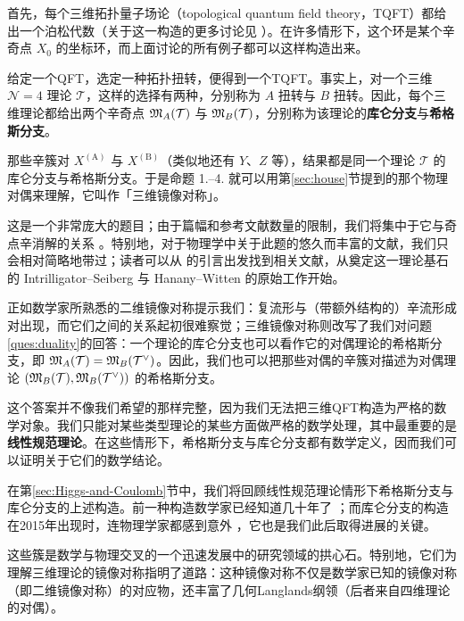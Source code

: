首先，每个三维拓扑量子场论（topological quantum field theory，TQFT）都给出一个泊松代数（关于这一构造的更多讨论见 \cite{BBBDN}）。在许多情形下，这个环是某个辛奇点 $X_0$ 的坐标环，而上面讨论的所有例子都可以这样构造出来。

给定一个QFT，选定一种拓扑扭转，便得到一个TQFT。事实上，对一个三维 $\mathcal{N}=4$ 理论 $\mathcal{T}$，这样的选择有两种，分别称为 $A$ 扭转与 $B$ 扭转。因此，每个三维理论都给出两个辛奇点 $\mathfrak{M}_A(\mathcal{T})$ 与 $\mathfrak{M}_B(\mathcal{T})$，分别称为该理论的\textbf{库仑分支}与\textbf{希格斯分支}。

那些辛簇对 $X^{(\mathrm{A})}$ 与 $X^{(\mathrm{B})}$（类似地还有 $Y$、$Z$ 等），结果都是同一个理论 $\mathcal{T}$ 的库仑分支与希格斯分支。于是命题 1.--4. 就可以用第\ref{sec:house}节提到的那个物理对偶来理解，它叫作「三维镜像对称」。

这是一个非常庞大的题目；由于篇幅和参考文献数量的限制，我们将集中于它与奇点辛消解的关系 \cite{beauvilleSymplecticSingularities2000}。特别地，对于物理学中关于此题的悠久而丰富的文献，我们只会相对简略地带过；读者可以从 \cite{bullimoreBoundariesMirror2016} 的引言出发找到相关文献，从奠定这一理论基石的 Intrilligator--Seiberg \cite{intriligatorMirrorSymmetry1996} 与 Hanany--Witten \cite{hananyTypeIIB1997} 的原始工作开始。

正如数学家所熟悉的二维镜像对称提示我们：复流形与（带额外结构的）辛流形成对出现，而它们之间的关系起初很难察觉；三维镜像对称则改写了我们对问题\ref{ques:duality}的回答：一个理论的库仑分支也可以看作它的对偶理论的希格斯分支，即 $\mathfrak{M}_A(\mathcal{T})=\mathfrak{M}_B(\mathcal{T}^{\vee})$。因此，我们也可以把那些对偶的辛簇对描述为对偶理论 $(\mathfrak{M}_B(\mathcal{T}), \mathfrak{M}_B(\mathcal{T}^{\vee}) )$ 的希格斯分支。

这个答案并不像我们希望的那样完整，因为我们无法把三维QFT构造为严格的数学对象。我们只能对某些类型理论的某些方面做严格的数学处理，其中最重要的是\textbf{线性规范理论}。在这些情形下，希格斯分支与库仑分支都有数学定义，因而我们可以证明关于它们的数学结论。

在第\ref{sec:Higgs-and-Coulomb}节中，我们将回顾线性规范理论情形下希格斯分支与库仑分支的上述构造。前一种构造数学家已经知道几十年了 \cite{hitchinHyperkahlerMetrics1987}；而库仑分支的构造在2015年出现时，连物理学家都感到意外 \cite{BFN}，它也是我们此后取得进展的关键。

这些簇是数学与物理交叉的一个迅速发展中的研究领域的拱心石。特别地，它们为理解三维理论的镜像对称指明了道路：这种镜像对称不仅是数学家已知的镜像对称（即二维镜像对称）的对应物，还丰富了几何Langlands纲领（后者来自四维理论的对偶）。

